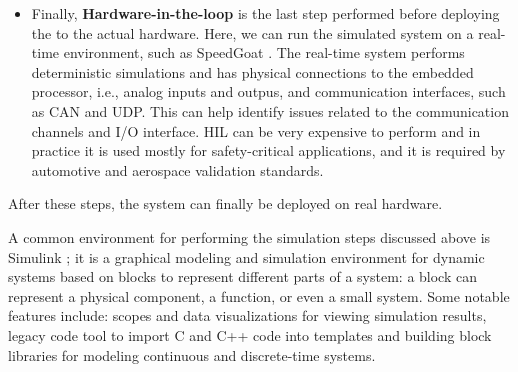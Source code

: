 \begin{itemize}
    \item Finally, \textbf{Hardware-in-the-loop} is the last step performed before deploying the \es to the actual hardware. Here, we can run the simulated system on a real-time environment, such as SpeedGoat \cite{SpeedGoat}. The real-time system performs deterministic simulations and has physical connections to the embedded processor, i.e., analog inputs and outpus, and communication interfaces, such as CAN and UDP. This can help identify issues related to the communication channels and I/O interface. HIL can be very expensive to perform and in practice it is used mostly for safety-critical applications, and it is required by automotive and aerospace validation standards. 
\end{itemize}

After these steps, the system can finally be deployed on real hardware.

A common environment for performing the simulation steps discussed above is Simulink \cite{Simulink}; it is a graphical modeling and simulation environment for dynamic systems based on blocks to represent different parts of a system: a block can represent a physical component, a function, or even a small system. Some notable features include: scopes and data visualizations for viewing simulation results, legacy code tool to import C and C++ code into templates and building block libraries for modeling continuous and discrete-time systems.



